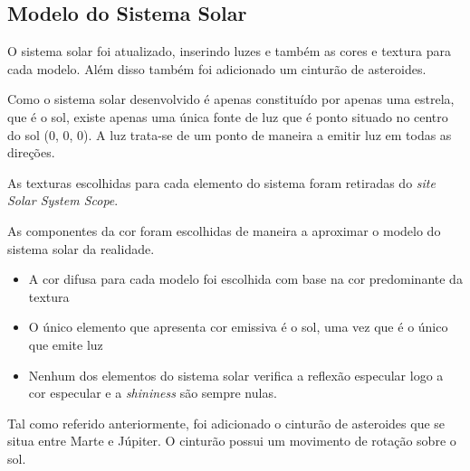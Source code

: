 \documentclass[relatorio.tex]{subfiles}
\begin{document}
    
\subsection{Modelo do Sistema Solar} \label{subsec:sistema_solar}

O sistema solar foi atualizado, inserindo luzes e também as cores
e textura para cada modelo. Além disso também foi adicionado um 
cinturão de asteroides.

Como o sistema solar desenvolvido é apenas constituído por apenas uma estrela, que é
o sol, existe apenas uma única fonte de luz que é ponto situado no centro do sol (0, 0, 0). A 
luz trata-se de um ponto de maneira a emitir luz em todas as direções.

As texturas escolhidas para cada elemento do sistema foram retiradas do \textit{site Solar System Scope}.

As componentes da cor foram escolhidas de maneira a aproximar o modelo do sistema solar da realidade. 
\begin{itemize}
    \item A cor difusa para cada modelo foi escolhida com base na cor predominante da textura
    \item O único elemento que apresenta cor emissiva é o sol, uma vez que é o único que emite luz
    \item Nenhum dos elementos do sistema solar verifica a reflexão especular logo a cor especular 
    e a \textit{shininess} são sempre nulas.
\end{itemize}

Tal como referido anteriormente, foi adicionado o cinturão de asteroides que se situa entre Marte e 
Júpiter. O cinturão possui um movimento de rotação sobre o sol.
\end{document}
